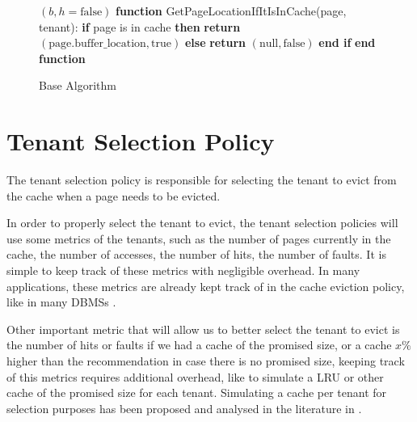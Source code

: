 \begin{figure}[htbp]
\begin{minipage}{\linewidth}
\begin{algorithm}[H]
\begin{algorithmic}
                    \RETURN $(b, h = \text{false})$
                \ENDIF
            \ENDIF
            \STATE
            \STATE \textbf{function} GetPageLocationIfItIsInCache(page, tenant):
            \STATE \hspace{\algorithmicindent} \textbf{if} page is in cache \textbf{then}
            \STATE \hspace{\algorithmicindent} \hspace{\algorithmicindent} \textbf{return} $(\text{page.buffer\_location}, \text{true})$
            \STATE \hspace{\algorithmicindent} \textbf{else}
            \STATE \hspace{\algorithmicindent} \hspace{\algorithmicindent} \textbf{return} $(\text{null}, \text{false})$
            \STATE \hspace{\algorithmicindent} \textbf{end if}
            \STATE \textbf{end function}
        \end{algorithmic}
    \end{algorithm}
    \caption{Base Algorithm}
    \label{fig:base_algorithm}
    \end{minipage}
\end{figure}
    

\section{Tenant Selection Policy}

The tenant selection policy is responsible for selecting the tenant
to evict from the cache when a page needs to be evicted.

In order to properly select the tenant to evict, the tenant selection policies will use 
some metrics of the tenants, such as the number of pages currently in the cache, 
the number of accesses, the number of hits, the number of faults. It is simple to 
keep track of these metrics with negligible overhead. In many applications, these 
metrics are already kept track of in the cache eviction policy, like in many DBMSs \cite{buffer-sharing-1}.

Other important metric that will allow us to better select the tenant to evict is 
the number of hits or faults if we had a cache of the promised size, or a cache 
$x\%$ higher than the recommendation in case there is no promised size, keeping track of 
this metrics requires additional overhead, like to simulate a LRU or other cache 
of the promised size for each tenant. Simulating a cache per tenant for selection 
purposes has been proposed and analysed in the literature in \cite{buffer-sharing-1}.

